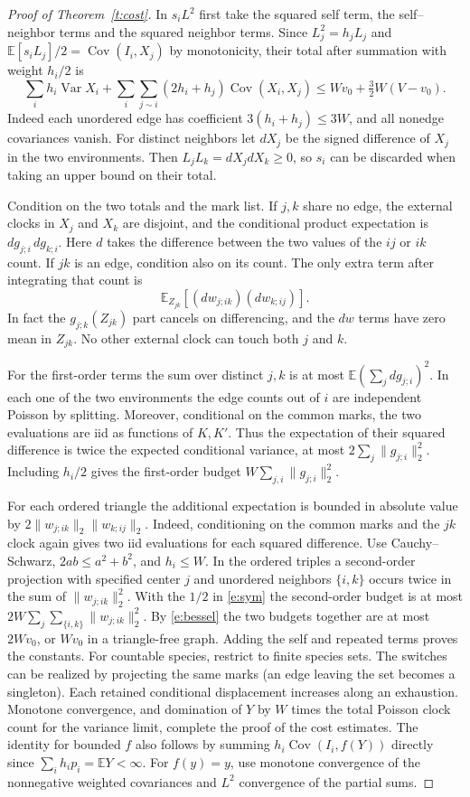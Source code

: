 \documentclass[11pt]{article}
\newcommand{\E}{\mathbb E}
\newcommand{\Var}{\operatorname{Var}}
\newcommand{\Cov}{\operatorname{Cov}}
\numberwithin{equation}{section}
\begin{document}
\begin{proof}[Proof of Theorem~\ref{t:cost}]
In $s_iL^2$ first take the squared self term, the self--neighbor terms and the squared
neighbor terms. Since $L_j^2=h_j L_j$ and $\E[s_i L_j]/2=\Cov(I_i,X_j)$ by monotonicity,
their total after summation with weight $h_i/2$ is
\[
 \sum_i h_i\Var X_i+\sum_i\sum_{j\sim i}(2h_i+h_j)\Cov(X_i,X_j)
 \le W v_0+\tfrac32 W(V-v_0).
\]
Indeed each unordered edge has coefficient $3(h_i+h_j)\le3W$, and all nonedge
covariances vanish. For distinct neighbors let $dX_j$ be the signed difference of $X_j$ in the two
environments. Then $L_jL_k=dX_jdX_k\ge0$, so $s_i$ can be discarded when taking an upper
bound on their total.

Condition on the two totals and the mark list. If $j,k$ share no edge, the external
clocks in $X_j$ and $X_k$ are disjoint, and the conditional product expectation is
$dg_{j;i}\,dg_{k;i}$. Here $d$ takes the difference between the two values of the
$ij$ or $ik$ count. If $jk$ is an edge, condition also on its count. The only extra
term after integrating that count is
\[
 \E_{Z_{jk}}[(d w_{j;ik})(d w_{k;ij})].
\]
In fact the $g_{j;k}(Z_{jk})$ part cancels on differencing, and the $dw$ terms have
zero mean in $Z_{jk}$. No other external clock can touch both $j$ and $k$.

For the first-order terms the sum over distinct $j,k$ is at most
$\E(\sum_j dg_{j;i})^2$. In each one of the two environments the edge counts out of
$i$ are independent Poisson by splitting. Moreover, conditional on the common marks, the two evaluations are iid as
functions of $K,K'$. Thus the expectation of their squared difference is twice the
expected conditional variance, at most $2\sum_j\|g_{j;i}\|_2^2$.
Including $h_i/2$ gives the first-order budget $W\sum_{j,i}\|g_{j;i}\|_2^2$.

For each ordered triangle the additional expectation is bounded in absolute value by
$2\|w_{j;ik}\|_2\|w_{k;ij}\|_2$. Indeed, conditioning on the common marks and
the $jk$ clock again gives two iid evaluations for each squared difference.
Use Cauchy--Schwarz, $2ab\le a^2+b^2$, and $h_i\le W$. In the ordered triples
a second-order projection with specified center $j$ and unordered neighbors
$\{i,k\}$ occurs twice in the sum of $\|w_{j;ik}\|_2^2$. With the $1/2$ in
\eqref{e:sym} the second-order budget is at most
$2W\sum_j\sum_{\{i,k\}}\|w_{j;ik}\|_2^2$.
By \eqref{e:bessel} the two budgets together are at most $2Wv_0$, or $Wv_0$ in
a triangle-free graph. Adding the self and repeated terms proves the constants.
For countable species, restrict to finite species sets. The switches can be realized
by projecting the same marks (an edge leaving the set becomes a singleton). Each
retained conditional displacement increases along an exhaustion. Monotone convergence,
and domination of $Y$ by $W$ times the total Poisson clock count for the variance
limit, complete the proof of the cost estimates. The identity for bounded
$f$ also follows by summing $h_i\Cov(I_i,f(Y))$ directly since
$\sum_i h_i p_i=\E Y<\infty$. For $f(y)=y$, use monotone convergence
of the nonnegative weighted covariances and $L^2$ convergence of the partial sums.
\end{proof}
\end{document}
